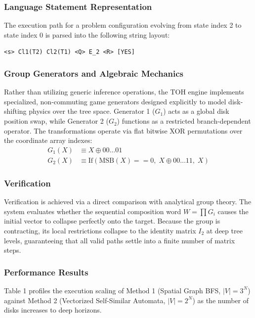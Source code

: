 \documentclass[twocolumn]{article}
\begin{document}
\subsubsection{Language Statement Representation}
The execution path for a problem configuration evolving from state index 2 to state index 0 is parsed into the following string layout:
\begin{center}
    \texttt{<s> Cl1(T2) Cl2(T1) <Q> E\_2 <R> [YES]}
\end{center}

\subsubsection{Group Generators and Algebraic Mechanics}
Rather than utilizing generic inference operations, the TOH engine implements specialized, non-commuting game generators designed explicitly to model disk-shifting physics over the tree space. Generator 1 ($G_1$) acts as a global disk position swap, while Generator 2 ($G_2$) functions as a restricted branch-dependent operator. The transformations operate via flat bitwise XOR permutations over the coordinate array indexes:
\begin{align}
    G_1(X) &\equiv X \oplus 00\dots01 \\
    G_2(X) &\equiv \text{If}\left(\text{MSB}(X) == 0, \; X \oplus 00\dots11, \; X\right)
\end{align}

\subsubsection{Verification}
Verification is achieved via a direct comparison with analytical group theory. The system evaluates whether the sequential composition word $W = \prod G_i$ causes the initial vector to collapse perfectly onto the target. Because the group is contracting, its local restrictions collapse to the identity matrix $I_2$ at deep tree levels, guaranteeing that all valid paths settle into a finite number of matrix steps.

\subsubsection{Performance Results}
Table 1 profiles the execution scaling of Method 1 (Spatial Graph BFS, $|V|=3^N$) against Method 2 (Vectorized Self-Similar Automata, $|V|=2^N$) as the number of disks increases to deep horizons.
\end{document}
